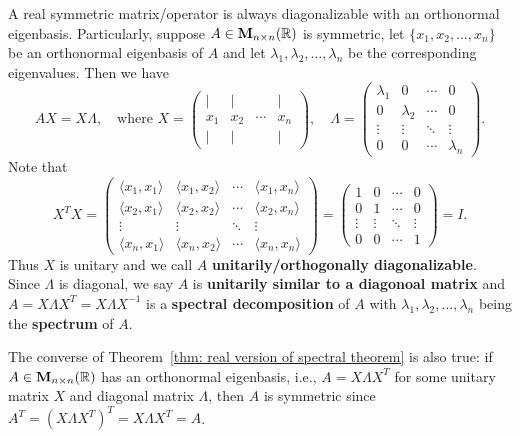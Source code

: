     \begin{remarkenv}
        A real symmetric matrix/operator is always diagonalizable with an orthonormal eigenbasis. Particularly, suppose $A \in \mathbf{M}_{n\times n}(\mathbb{R})$ is symmetric, let $\{x_1, x_2, \ldots, x_n\}$ be an orthonormal eigenbasis of $A$ and let $\lambda_1, \lambda_2, \ldots, \lambda_n$ be the corresponding eigenvalues. Then we have
        $$ AX = X \Lambda, \quad \text{where } X = \begin{pmatrix}
            | & | & & | \\
            x_1 & x_2 & \cdots & x_n \\
            | & | & & |
        \end{pmatrix}, \quad \Lambda = \begin{pmatrix}
            \lambda_1 & 0 & \cdots & 0 \\
            0 & \lambda_2 & \cdots & 0 \\
            \vdots & \vdots & \ddots & \vdots \\
            0 & 0 & \cdots & \lambda_n
        \end{pmatrix}. $$
        Note that
        $$ X^T X = \begin{pmatrix}
            \langle x_1, x_1 \rangle & \langle x_1, x_2 \rangle & \cdots & \langle x_1, x_n \rangle \\
            \langle x_2, x_1 \rangle & \langle x_2, x_2 \rangle & \cdots & \langle x_2, x_n \rangle \\
            \vdots & \vdots & \ddots & \vdots \\
            \langle x_n, x_1 \rangle & \langle x_n, x_2 \rangle & \cdots & \langle x_n, x_n \rangle
        \end{pmatrix}
        = \begin{pmatrix}
            1 & 0 & \cdots & 0 \\
            0 & 1 & \cdots & 0 \\
            \vdots & \vdots & \ddots & \vdots \\
            0 & 0 & \cdots & 1
        \end{pmatrix} = I. $$
        Thus $X$ is unitary and we call $A$ \textbf{unitarily/orthogonally diagonalizable}. Since $\Lambda$ is diagonal, we say $A$ is \textbf{unitarily similar to a diagonoal matrix} and $A=X\Lambda X^T = X \Lambda X^{-1}$ is a \textbf{spectral decomposition} of $A$ with $\lambda_1, \lambda_2, \ldots, \lambda_n$ being the \textbf{spectrum} of $A$.

        The converse of Theorem~\ref{thm: real version of spectral theorem} is also true: if $A\in \mathbf{M}_{n\times n}(\mathbb{R})$ has an orthonormal eigenbasis, i.e., $A=X\Lambda X^T$ for some unitary matrix $X$ and diagonal matrix $\Lambda$, then $A$ is symmetric since $A^T = (X\Lambda X^T)^T = X \Lambda X^T = A$.
    \end{remarkenv}
